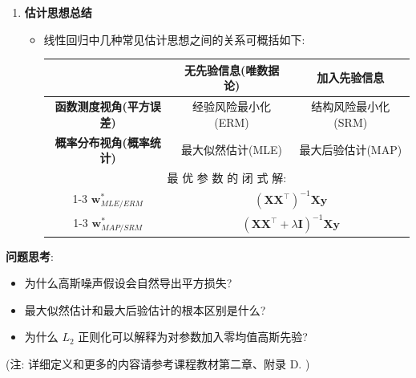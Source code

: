 \documentclass{../nndlcourse}
\begin{document}
\begin{enumerate}
  \item \textbf{估计思想总结}
    \begin{itemize}
    \item 线性回归中几种常见估计思想之间的关系可概括如下:
        \vspace{1em}
        \begin{center}
        \begin{tabular}{|c|c|c|}
        \hline
        & \textbf{无先验信息(唯数据论)} & \textbf{加入先验信息} \\
        \hline
        \textbf{函数测度视角(平方误差)} & 经验风险最小化(ERM) & 结构风险最小化(SRM) \\
        \hline
        \textbf{概率分布视角(概率统计)} & 最大似然估计(MLE) & 最大后验估计(MAP) \\
        \hline
        \multicolumn{3}{|c|}{最  优  参  数  的  闭  式  解: } \\
        \cline{1-3}
            $\boldsymbol{w}^*_{MLE / ERM}$ & \multicolumn{2}{c|}{$(\boldsymbol{X}\boldsymbol{X}^\top)^{-1}\boldsymbol{X}\boldsymbol{y}$} \\
        \cline{1-3}
            $\boldsymbol{w}^*_{MAP / SRM}$ & \multicolumn{2}{c|}{$(\boldsymbol{X}\boldsymbol{X}^\top + \lambda \boldsymbol{I})^{-1}\boldsymbol{X}\boldsymbol{y}$} \\
        \hline
        \end{tabular}
        \end{center}
    \end{itemize}
\end{enumerate}

\textbf{问题思考}:

\begin{itemize}
  \item 为什么高斯噪声假设会自然导出平方损失?
  \item 最大似然估计和最大后验估计的根本区别是什么?
  \item 为什么 $L_2$ 正则化可以解释为对参数加入零均值高斯先验?
\end{itemize}

(注: 详细定义和更多的内容请参考课程教材第二章、附录 D. )
\end{document}
